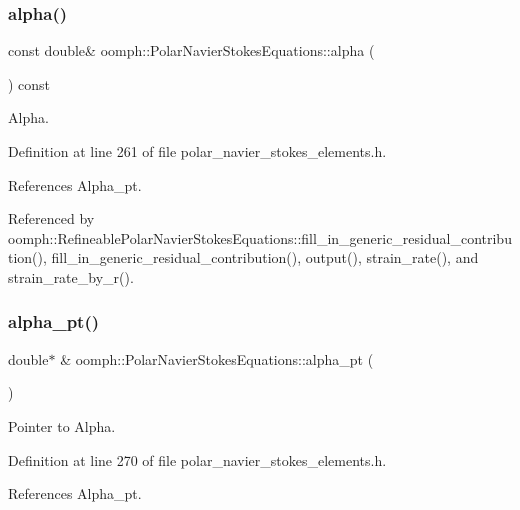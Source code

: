 \subsubsection{\texorpdfstring{alpha()}{alpha()}}
{\footnotesize\ttfamily const double\& oomph\+::\+Polar\+Navier\+Stokes\+Equations\+::alpha (\begin{DoxyParamCaption}{ }\end{DoxyParamCaption}) const\hspace{0.3cm}{\ttfamily [inline]}}



Alpha. 



Definition at line 261 of file polar\+\_\+navier\+\_\+stokes\+\_\+elements.\+h.



References Alpha\+\_\+pt.



Referenced by oomph\+::\+Refineable\+Polar\+Navier\+Stokes\+Equations\+::fill\+\_\+in\+\_\+generic\+\_\+residual\+\_\+contribution(), fill\+\_\+in\+\_\+generic\+\_\+residual\+\_\+contribution(), output(), strain\+\_\+rate(), and strain\+\_\+rate\+\_\+by\+\_\+r().

\mbox{\label{classoomph_1_1PolarNavierStokesEquations_acb011e76496a8c8dac3b980ab7025c3e}} 
\subsubsection{\texorpdfstring{alpha\+\_\+pt()}{alpha\_pt()}}
{\footnotesize\ttfamily double$\ast$ \& oomph\+::\+Polar\+Navier\+Stokes\+Equations\+::alpha\+\_\+pt (\begin{DoxyParamCaption}{ }\end{DoxyParamCaption})\hspace{0.3cm}{\ttfamily [inline]}}



Pointer to Alpha. 



Definition at line 270 of file polar\+\_\+navier\+\_\+stokes\+\_\+elements.\+h.



References Alpha\+\_\+pt.



